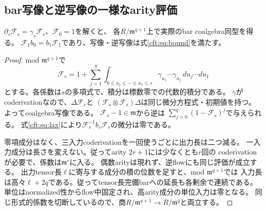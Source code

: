 \subsection{bar写像と逆写像の一様なarity評価}
\begin{lemma}[順序付きflowと逆写像]\label{cft:lem:flow}
$\partial_s\mathcal F_s=\gamma_s\mathcal F_s$、$\mathcal F_0=1$を解くと、
各$R/\mathfrak m^{q+1}$上で実際のbar coalgebra同型を得る。
$\mathcal F_1b_0=b_1\mathcal F_1$であり、写像・逆写像は式\eqref{cft:eq:bound}を満たす。
\end{lemma}
\begin{proof}
mod $\mathfrak m^{q+1}$で
\begin{equation}\label{cft:eq:ordered}
 \mathcal F_s=1+\sum_{j=1}^{q}
 \int_{0\le u_j\le\cdots\le u_1\le s}
 \gamma_{u_1}\cdots\gamma_{u_j}\,du_j\cdots du_1
\end{equation}
とする。各係数は$s$の多項式で、積分は標数零での代数的積分である。
$\gamma$がcoderivationなので、$\Delta\mathcal F_s$と
$(\mathcal F_s\otimes\mathcal F_s)\Delta$は同じ微分方程式・初期値を持つ。
よってcoalgebra写像である。
$\mathcal F_s-1\in\mathfrak m$から逆は
$\sum_{j=0}^{q}(1-\mathcal F_s)^j$で与えられる。
式\eqref{cft:eq:lax}により$\mathcal F_s^{-1}b_s\mathcal F_s$の微分は零である。

零項成分はなく、三入力coderivationを一回使うごとに出力長は二つ減る。
一入力成分は長さを変えない。従ってarity $2r+1$には少なくとも$r$回の
coderivationが必要で、係数は$\mathfrak m^r$に入る。
偶数arityは現れず、逆flowにも同じ評価が成立する。
出力tensor長$\ell$に寄与する成分の積の位数を足すと、mod $\mathfrak m^{q+1}$では
入力長は高々$\ell+2q$である。従ってtensor長完備barへの延長も各剰余で連続である。
単位はnormalized性からflow中固定され、高arity成分の単位入力は零となる。
同じ形式的係数を切断しているので、商$R/\mathfrak m^{q+1}\to R/\mathfrak m^q$と両立する。
\end{proof}

